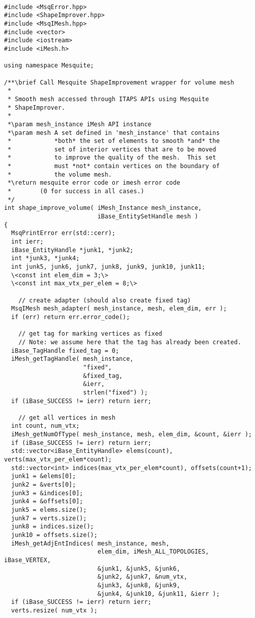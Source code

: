 \begin{lstlisting}

#include <MsqError.hpp>
#include <ShapeImprover.hpp>
#include <MsqIMesh.hpp>
#include <vector>
#include <iostream>
#include <iMesh.h>

using namespace Mesquite;

/**\brief Call Mesquite ShapeImprovement wrapper for volume mesh
 *
 * Smooth mesh accessed through ITAPS APIs using Mesquite
 * ShapeImprover.
 *
 *\param mesh_instance iMesh API instance
 *\param mesh A set defined in 'mesh_instance' that contains
 *            *both* the set of elements to smooth *and* the
 *            set of interior vertices that are to be moved
 *            to improve the quality of the mesh.  This set
 *            must *not* contain vertices on the boundary of
 *            the volume mesh.
 *\return mesquite error code or imesh error code
 *        (0 for success in all cases.)
 */
int shape_improve_volume( iMesh_Instance mesh_instance,
                          iBase_EntitySetHandle mesh )
{
  MsqPrintError err(std::cerr);
  int ierr;
  iBase_EntityHandle *junk1, *junk2;
  int *junk3, *junk4;
  int junk5, junk6, junk7, junk8, junk9, junk10, junk11;
  \<const int elem_dim = 3;\>
  \<const int max_vtx_per_elem = 8;\>
  
    // create adapter (should also create fixed tag)
  MsqIMesh mesh_adapter( mesh_instance, mesh, elem_dim, err );
  if (err) return err.error_code();

    // get tag for marking vertices as fixed
    // Note: we assume here that the tag has already been created.
  iBase_TagHandle fixed_tag = 0;
  iMesh_getTagHandle( mesh_instance,
                      "fixed",
                      &fixed_tag,
                      &ierr,
                      strlen("fixed") );
  if (iBase_SUCCESS != ierr) return ierr;

    // get all vertices in mesh
  int count, num_vtx;
  iMesh_getNumOfType( mesh_instance, mesh, elem_dim, &count, &ierr );
  if (iBase_SUCCESS != ierr) return ierr;
  std::vector<iBase_EntityHandle> elems(count), verts(max_vtx_per_elem*count);
  std::vector<int> indices(max_vtx_per_elem*count), offsets(count+1);
  junk1 = &elems[0];
  junk2 = &verts[0];
  junk3 = &indices[0];
  junk4 = &offsets[0];
  junk5 = elems.size();
  junk7 = verts.size();
  junk8 = indices.size();
  junk10 = offsets.size();
  iMesh_getAdjEntIndices( mesh_instance, mesh, 
                          elem_dim, iMesh_ALL_TOPOLOGIES, iBase_VERTEX,
                          &junk1, &junk5, &junk6,
                          &junk2, &junk7, &num_vtx,
                          &junk3, &junk8, &junk9,
                          &junk4, &junk10, &junk11, &ierr );
  if (iBase_SUCCESS != ierr) return ierr;
  verts.resize( num_vtx );


\end{lstlisting}
